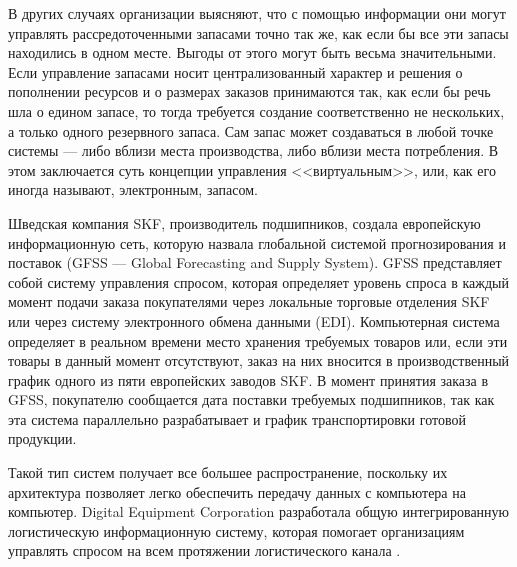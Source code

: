 В других случаях организации выясняют, что с помощью информации они могут управлять рассредоточенными запасами точно так же, как если бы все эти запасы находились в одном месте.
Выгоды от этого могут быть весьма значительными.
Если управление запасами носит централизованный характер и решения о пополнении ресурсов и о размерах заказов принимаются так, как если бы речь шла о едином запасе, то тогда требуется создание соответственно не нескольких, а только одного резервного запаса.
Сам запас может создаваться в любой точке системы --- либо вблизи места производства, либо вблизи места потребления.
В этом заключается суть концепции управления <<виртуальным>>, или, как его иногда называют, электронным, запасом.

Шведская компания SKF, производитель подшипников, создала европейскую информационную сеть, которую назвала глобальной системой прогнозирования и поставок (GFSS --- Global Forecasting and Supply System).
GFSS представляет собой систему управления спросом, которая определяет уровень спроса в каждый момент подачи заказа покупателями через локальные торговые отделения SKF или через систему электронного обмена данными (EDI).
Компьютерная система определяет в реальном времени место хранения требуемых товаров или, если эти товары в данный момент отсутствуют, заказ на них вносится в производственный график одного из пяти европейских заводов SKF.
В момент принятия заказа в GFSS, покупателю сообщается дата поставки требуемых подшипников, так как эта система параллельно разрабатывает и график транспортировки готовой продукции.

Такой тип систем получает все большее распространение, поскольку их архитектура позволяет легко обеспечить передачу данных с компьютера на компьютер.
Digital Equipment Corporation разработала общую интегрированную логистическую информационную систему, которая помогает организациям управлять спросом на всем протяжении логистического канала \cite[с. 225--228]{christopher}.








